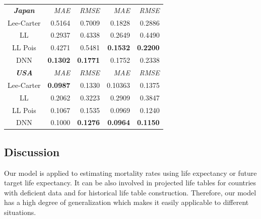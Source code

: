 \documentclass[a4,11pt]{article}
\begin{document}
\begin{table}[H]
\begin{tabular}{crrrr}
\midrule
			\textbf{\textit{Japan}}       &   \textit{MAE} & \textit{RMSE} &  \textit{MAE} & \textit{RMSE}\\
                	Lee-Carter                       &  0.5164    &   0.7009        &	 0.1828   &   0.2886\\	
                   	LL                                   &  0.2937    &   0.4338 	&      0.2649    &   0.4490	\\	
			LL Pois                            &  0.4271    &   0.5481  	&      \textbf{0.1532}    &   \textbf{0.2200}	\\			
			DNN                                &  \textbf{0.1302}    &   \textbf{0.1771}   	&      0.1752    &   0.2338	\\
\midrule
	            	\textbf{\textit{USA}}        &   \textit{MAE} & \textit{RMSE} & \textit{MAE} & \textit{RMSE} \\
                 	Lee-Carter                      & \textbf{0.0987}  &   0.1330          &	0.10363   &    0.1375	\\	
                   	LL                                  &  0.2062  &   0.3223   	&      0.2909   &    0.3847	\\	
			LL Pois                           &	 0.1067  &   0.1535   	&      0.0969   &    0.1240	\\			
			DNN                               &  0.1000  &   \textbf{0.1276}   	&     \textbf{0.0964}   &    \textbf{0.1150}	\\
\bottomrule
\end{tabular}
\label{tab:1}
\end{table}	

\subsection{Discussion}
Our model is applied to estimating mortality rates using life expectancy or future target life expectancy. It can be also involved in projected life tables for countries with deficient data and for historical life table construction. Therefore, our model has a high degree of generalization which makes it easily applicable to different situations.
		
\end{document}
